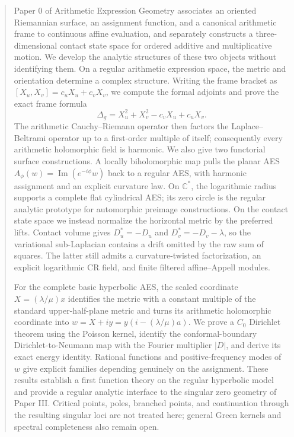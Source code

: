 \documentclass[11pt]{article}
\theoremstyle{definition}
\theoremstyle{remark}
\newcommand{\C}{\mathbb{C}}
\begin{document}
\begin{abstract}
Paper 0 of Arithmetic Expression Geometry associates an oriented Riemannian surface,
an assignment function, and a canonical arithmetic frame to continuous affine
evaluation, and separately constructs a three-dimensional contact state space for
ordered additive and multiplicative motion.  We develop the analytic structures of
these two objects without identifying them.  On a regular arithmetic expression
space, the metric and orientation determine a complex structure.  Writing the frame
bracket as $[X_u,X_v]=c_uX_u+c_vX_v$, we compute the formal adjoints and prove the
exact frame formula
\[
 \Delta_g=X_u^2+X_v^2-c_vX_u+c_uX_v.
\]
The arithmetic Cauchy--Riemann operator then factors the Laplace--Beltrami operator
up to a first-order multiple of itself; consequently every arithmetic holomorphic
field is harmonic.  We also give two functorial surface constructions.  A locally
biholomorphic map pulls the planar AES
\(A_\phi(w)=\operatorname{Im}(e^{-i\phi}w)\) back to a regular AES, with harmonic
assignment and an explicit curvature law.  On \(\C^*\), the logarithmic radius
supports a complete flat cylindrical AES; its zero circle is the regular analytic
prototype for automorphic preimage constructions.  On the contact state space we
instead normalize the horizontal
metric by the preferred lifts.  Contact volume gives
$D_u^*=-D_u$ and $D_v^*=-D_v-\lambda$, so the variational sub-Laplacian contains a
drift omitted by the raw sum of squares.  The latter still admits a curvature-twisted
factorization, an explicit logarithmic CR field, and finite filtered
affine--Appell modules.

For the complete basic hyperbolic AES, the scaled coordinate
$X=(\lambda/\mu)x$ identifies the metric with a constant multiple of the standard
upper-half-plane metric and turns its arithmetic holomorphic coordinate into
$w=X+iy=y(i-(\lambda/\mu)a)$.  We prove a $C_0$ Dirichlet theorem using the Poisson
kernel, identify the conformal-boundary Dirichlet-to-Neumann map with the Fourier
multiplier $|D|$, and derive its exact energy identity.  Rational functions and
positive-frequency modes of $w$ give explicit families depending genuinely on the
assignment.  These results establish a first function theory on the regular
hyperbolic model and provide a regular analytic interface to the singular zero
geometry of Paper III.  Critical points, poles, branched points, and continuation
through the resulting singular loci are not treated here; general Green kernels and
spectral completeness also remain open.
\end{abstract}
\end{document}
